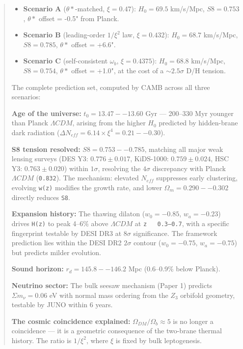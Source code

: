 \documentclass[aps,prd,preprint,superscriptaddress,longbibliography]{revtex4-2}
\begin{document}
\begin{abstract}
\begin{itemize}
  \item \textbf{Scenario A} ($\theta*$-matched, $\xi = 0.47$): $H_{0} = 69.5$ km/s/Mpc, $S8 = 0.753$, $\theta*$ offset = -0.5" from Planck.
  \item \textbf{Scenario B} (leading-order $1/\xi^{2}$ law, $\xi = 0.432$): $H_{0} = 68.7$ km/s/Mpc, $S8 = 0.785$, $\theta*$ offset = +6.6".
  \item \textbf{Scenario C} (self-consistent $\omega_b$, $\xi = 0.4375$): $H_{0} = 68.8$ km/s/Mpc, $S8 = 0.754$, $\theta*$ offset = +1.0", at the cost of a $\sim 2.5\sigma$ D/H tension.
\end{itemize}

The complete prediction set, computed by CAMB across all three scenarios:

\textbf{Age of the universe:} $t_{0} = 13.47--13.60$ Gyr --- 200--330 Myr younger than Planck $\Lambda CDM$, arising from the higher $H_{0}$ predicted by hidden-brane dark radiation ($\Delta N_{eff} = 6.14 \times \xi^{4} = 0.21--0.30$).

\textbf{S8 tension resolved:} $S8 = 0.753--0.785$, matching all major weak lensing surveys (DES Y3: $0.776 \pm 0.017$, KiDS-1000: $0.759 \pm 0.024$, HSC Y3: $0.763 \pm 0.020$) within $1\sigma$, resolving the $4\sigma$ discrepancy with Planck $\Lambda CDM$ (\texttt{0.832}). The mechanism: elevated $N_{eff}$ suppresses early clustering, evolving \texttt{w(z)} modifies the growth rate, and lower $\Omega_m = 0.290--0.302$ directly reduces \texttt{S8}.

\textbf{Expansion history:} The thawing dilaton ($w_{0} = -0.85$, $w_a = -0.23$) drives \texttt{H(z)} to peak 4--6\% above $\Lambda CDM$ at \texttt{z ~ 0.3--0.7}, with a specific fingerprint testable by DESI DR3 at $8\sigma$ significance. The framework prediction lies within the DESI DR2 $2\sigma$ contour ($w_{0} = -0.75$, $w_a = -0.75$) but predicts milder evolution.

\textbf{Sound horizon:} $r_d = 145.8--146.2$ Mpc (0.6--0.9\% below Planck).

\textbf{Neutrino sector:} The bulk seesaw mechanism (Paper 1) predicts $\Sigma m_\nu = 0.06$ eV with normal mass ordering from the $Z_{3}$ orbifold geometry, testable by JUNO within 6 years.

\textbf{The cosmic coincidence explained:} $\Omega_{DM}/\Omega_b \approx 5$ is no longer a coincidence --- it is a geometric consequence of the two-brane thermal history. The ratio is $1/\xi^{2}$, where $\xi$ is fixed by bulk leptogenesis.


\end{abstract}
\end{document}
